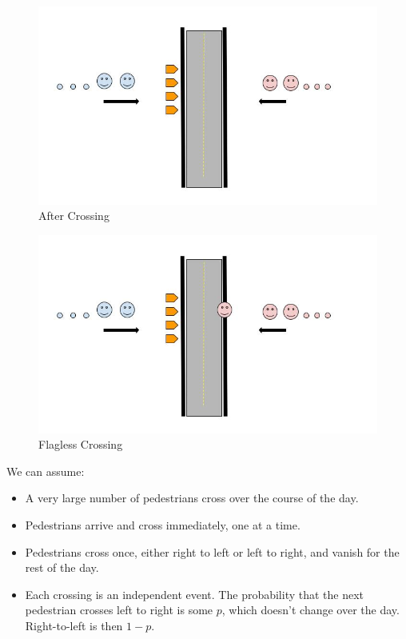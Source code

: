 \documentclass[11pt, oneside]{article} 	%
\begin{document}
\begin{figure}[!htb]
\centering
\includegraphics[scale=.3]{flags2}
\caption{After Crossing}
\label{fig:flags2}
\end{figure}

\begin{figure}[!htb]
\centering
\includegraphics[scale=.3]{flags3}
\caption{Flagless Crossing}
\label{fig:flags3}
\end{figure}

We can assume:
\begin{itemize}
\item A very large number of pedestrians cross over the course of the day.
\item Pedestrians arrive and cross immediately, one at a time.
\item Pedestrians cross once, either right to left or left to right, and vanish for the rest of the day.
\item Each crossing is an independent event. The probability that the next pedestrian crosses left to right is some $p$, which doesn't change over the day.  Right-to-left is then $1-p$. 
\end{itemize}
\end{document}
